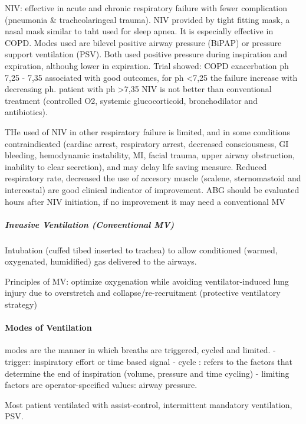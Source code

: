 \documentclass[
  letterpaper,
  DIV=11,
  numbers=noendperiod]{scrreprt}
\let\oldparagraph\paragraph
\renewcommand{\paragraph}[1]{\oldparagraph{#1}\mbox{}}
\let\oldsubparagraph\subparagraph
\renewcommand{\subparagraph}[1]{\oldsubparagraph{#1}\mbox{}}
\begin{document}
NIV: effective in acute and chronic respiratory failure with fewer
complication (pneumonia \& tracheolaringeal trauma). NIV provided by
tight fitting mask, a nasal mask similar to taht used for sleep apnea.
It is especially effective in COPD. Modes used are bilevel positive
airway pressure (BiPAP) or pressure support ventilation (PSV). Both used
positive pressure during inspiration and expiration, althouhg lower in
expiration. Trial showed: COPD exacerbation ph 7,25 - 7,35 associated
with good outcomes, for ph \textless7,25 the failure increase with
decreasing ph. patient with ph \textgreater7,35 NIV is not better than
conventional treatment (controlled O2, systemic glucocorticoid,
bronchodilator and antibiotics).

THe used of NIV in other respiratory failure is limited, and in some
conditions contraindicated (cardiac arrest, respiratory arrest,
decreased consciousness, GI bleeding, hemodynamic instability, MI,
facial trauma, upper airway obstruction, inability to clear secretion),
and may delay life saving measure. Reduced respiratory rate, decreased
the use of accesory muscle (scalene, sternomastoid and intercostal) are
good clinical indicator of improvement. ABG should be evaluated hours
after NIV initiation, if no improvement it may need a conventional MV

\subparagraph{Invasive Ventilation (Conventional
MV)}\label{invasive-ventilation-conventional-mv}

Intubation (cuffed tibed inserted to trachea) to allow conditioned
(warmed, oxygenated, humidified) gas delivered to the airways.

Principles of MV: optimize oxygenation while avoiding ventilator-induced
lung injury due to overstretch and collapse/re-recruitment (protective
ventilatory strategy)

\paragraph{Modes of Ventilation}\label{modes-of-ventilation}

modes are the manner in which breaths are triggered, cycled and limited.
- trigger: inspiratory effort or time based signal - cycle : refers to
the factors that determine the end of inspiration (volume, pressure and
time cycling) - limiting factors are operator-specified values: airway
pressure.

Most patient ventilated with assist-control, intermittent mandatory
ventilation, PSV.
\end{document}
